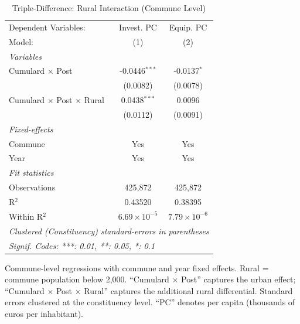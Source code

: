 
\begin{table}[htbp]
   \caption{\label{tab:triple_diff} Triple-Difference: Rural Interaction (Commune Level)}
   \centering
   \begin{tabular}{lcc}
      \tabularnewline \midrule \midrule
      Dependent Variables:                    & Invest. PC            & Equip. PC\\  
      Model:                                  & (1)                   & (2)\\  
      \midrule
      \emph{Variables}\\
      Cumulard $\times$ Post                  & -0.0446$^{***}$       & -0.0137$^{*}$\\   
                                              & (0.0082)              & (0.0078)\\   
      Cumulard $\times$ Post $\times$ Rural   & 0.0438$^{***}$        & 0.0096\\   
                                              & (0.0112)              & (0.0091)\\   
      \midrule
      \emph{Fixed-effects}\\
      Commune                                 & Yes                   & Yes\\  
      Year                                    & Yes                   & Yes\\  
      \midrule
      \emph{Fit statistics}\\
      Observations                            & 425,872               & 425,872\\  
      R$^2$                                   & 0.43520               & 0.38395\\  
      Within R$^2$                            & $6.69\times 10^{-5}$  & $7.79\times 10^{-6}$\\   
      \midrule \midrule
      \multicolumn{3}{l}{\emph{Clustered (Constituency) standard-errors in parentheses}}\\
      \multicolumn{3}{l}{\emph{Signif. Codes: ***: 0.01, **: 0.05, *: 0.1}}\\
   \end{tabular}
   
   \par \raggedright 
   Commune-level regressions with commune and year fixed effects. Rural = commune population below 2,000. ``Cumulard $\times$ Post'' captures the urban effect; ``Cumulard $\times$ Post $\times$ Rural'' captures the additional rural differential. Standard errors clustered at the constituency level. ``PC'' denotes per capita (thousands of euros per inhabitant).
\end{table}


